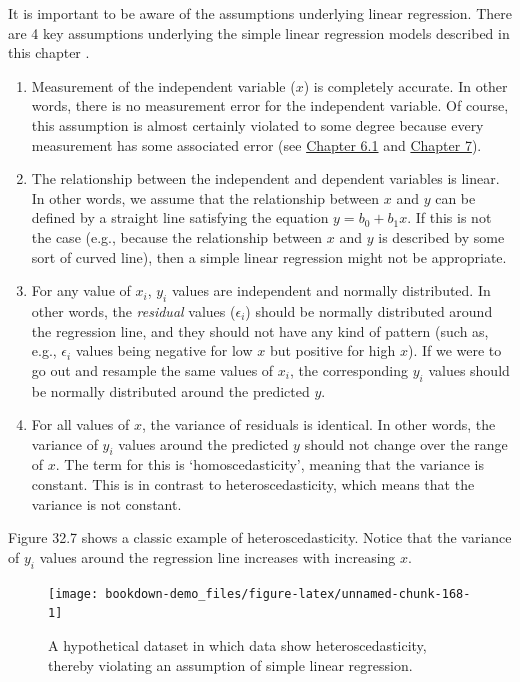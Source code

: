 \documentclass[
]{scrbook}
\begin{document}
It is important to be aware of the assumptions underlying linear regression.
There are 4 key assumptions underlying the simple linear regression models described in this chapter \citep{Sokal1995}.

\begin{enumerate}
\def\labelenumi{\arabic{enumi}.}
\item
  Measurement of the independent variable (\(x\)) is completely accurate. In other words, there is no measurement error for the independent variable.
  Of course, this assumption is almost certainly violated to some degree because every measurement has some associated error (see \protect\hyperlink{accuracy}{Chapter 6.1} and \protect\hyperlink{Chapter_7}{Chapter 7}).
\item
  The relationship between the independent and dependent variables is linear.
  In other words, we assume that the relationship between \(x\) and \(y\) can be defined by a straight line satisfying the equation \(y = b_{0} + b_{1}x\).
  If this is not the case (e.g., because the relationship between \(x\) and \(y\) is described by some sort of curved line), then a simple linear regression might not be appropriate.
\item
  For any value of \(x_{i}\), \(y_{i}\) values are independent and normally distributed.
  In other words, the \emph{residual} values (\(\epsilon_{i}\)) should be normally distributed around the regression line, and they should not have any kind of pattern (such as, e.g., \(\epsilon_{i}\) values being negative for low \(x\) but positive for high \(x\)).
  If we were to go out and resample the same values of \(x_{i}\), the corresponding \(y_{i}\) values should be normally distributed around the predicted \(y\).
\item
  For all values of \(x\), the variance of residuals is identical.
  In other words, the variance of \(y_{i}\) values around the predicted \(y\) should not change over the range of \(x\).
  The term for this is `homoscedasticity', meaning that the variance is constant.
  This is in contrast to heteroscedasticity, which means that the variance is not constant.
\end{enumerate}

Figure 32.7 shows a classic example of heteroscedasticity.
Notice that the variance of \(y_{i}\) values around the regression line increases with increasing \(x\).

\begin{figure}
\texttt{[image: bookdown-demo\_files/figure-latex/unnamed-chunk-168-1]} \caption{A hypothetical dataset in which data show heteroscedasticity, thereby violating an assumption of simple linear regression.}\label{fig:unnamed-chunk-168}
\end{figure}
\end{document}
